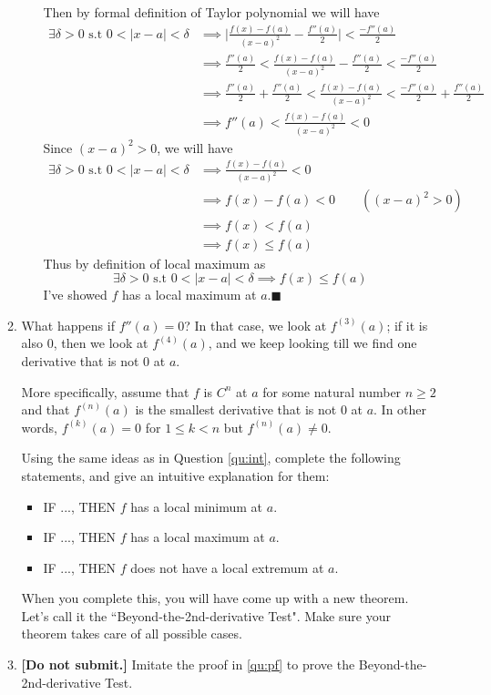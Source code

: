 \documentclass[12pt]{exam}
\begin{document}
\begin{enumerate}
\begin{enumerate}
\begin{itemize}
			        Then by formal definition of Taylor polynomial we will have
			        \begin{align*}
			            \exists\delta>0 \mbox{ s.t } 0<\vert{x-a}\vert<\delta&\implies\vert{\frac{f(x)-f(a)}{(x-a)^2}-\frac{f''(a)}{2}}\vert<\frac{-f''(a)}{2}\\
			            &\implies\frac{f''(a)}{2}<\frac{f(x)-f(a)}{(x-a)^2}-\frac{f''(a)}{2}<\frac{-f''(a)}{2}\\
			            &\implies\frac{f''(a)}{2}+\frac{f''(a)}{2}<\frac{f(x)-f(a)}{(x-a)^2}<\frac{-f''(a)}{2}+\frac{f''(a)}{2}\\
			            &\implies f''(a)<\frac{f(x)-f(a)}{(x-a)^2}<0
			        \end{align*}
			        Since $(x-a)^2>0$, we will have
			        \begin{align*}
			            \exists\delta>0 \mbox{ s.t } 0<\vert{x-a}\vert<\delta
			            &\implies\frac{f(x)-f(a)}{(x-a)^2}<0\\
			            &\implies f(x)-f(a)<0\qquad((x-a)^2>0)\\
			            &\implies f(x)<f(a)\\
			            &\implies f(x)\leq f(a)
			        \end{align*}
			        Thus by definition of local maximum as
			        $$
			            \exists\delta>0 \mbox{ s.t } 0<\vert{x-a}\vert<\delta\implies f(x)\leq f(a)
			        $$
			        I've showed $f$ has a local maximum at $a$.\qquad $\blacksquare$
			\end{itemize}
			
			\newpage
	
		\item \label{qu:conj} What happens if $f''(a)=0$?     In that case, we look at $f^{(3)}(a)$;  if it is also $0$, then we look at $f^{(4)}(a)$, and we keep looking till we find one derivative that is not $0$ at $a$.   
		
		More specifically, assume that $f$ is $C^n$ at $a$ for some natural number $n \geq 2$ and that $f^{(n)}(a)$ is the smallest derivative  that is not $0$ at $a$.   In other words, $f^{(k)}(a) =0$ for $ 1 \leq k < n$ but $f^{(n)}(a) \neq 0$.
		
		Using the same ideas as in Question \ref{qu:int}, complete the following statements, and give an intuitive explanation for them:
			\begin{itemize}
				\item  IF ..., THEN $f$ has a local minimum at $a$.
				\item  IF ..., THEN $f$ has a local maximum at $a$.
				\item  IF ..., THEN $f$ does not have a local extremum at $a$.
			\end{itemize}
		When you complete this, you will have come up with a new theorem.  Let's call it the ``Beyond-the-2nd-derivative Test".   Make sure your theorem takes care of all possible cases.  
		\item \label{qu:thm}  {\bf [Do not submit.]}  Imitate the proof in \ref{qu:pf} to prove the Beyond-the-2nd-derivative Test.		
	\end{enumerate}


\end{enumerate}
\end{document}
